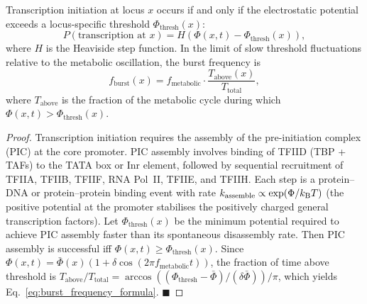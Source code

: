 \begin{theorem}
\label{thm:charge_threshold}
Transcription initiation at locus $x$ occurs if and only if the electrostatic
potential exceeds a locus-specific threshold $\Phi_{\mathrm{thresh}}(x)$:
\begin{equation}
  P(\text{transcription at } x) = H(\Phi(x,t) - \Phi_{\mathrm{thresh}}(x)),
  \label{eq:transcription_threshold}
\end{equation}
where $H$ is the Heaviside step function. In the limit of slow threshold
fluctuations relative to the metabolic oscillation, the burst frequency is
\begin{equation}
  f_{\mathrm{burst}}(x) = f_{\mathrm{metabolic}} \cdot
  \frac{T_{\mathrm{above}}(x)}{T_{\mathrm{total}}},
  \label{eq:burst_frequency_formula}
\end{equation}
where $T_{\mathrm{above}}$ is the fraction of the metabolic cycle during which
$\Phi(x,t) > \Phi_{\mathrm{thresh}}(x)$.
\end{theorem}

\begin{proof}
Transcription initiation requires the assembly of the pre-initiation complex
(PIC) at the core promoter. PIC assembly involves binding of TFIID (TBP +
TAFs) to the TATA box or Inr element, followed by sequential recruitment of
TFIIA, TFIIB, TFIIF, RNA Pol~II, TFIIE, and TFIIH. Each step is a
protein--DNA or protein--protein binding event with rate
$k_{\mathrm{assemble}} \propto \exp(\Phi/k_{\mathrm{B}} T)$ (the positive potential at
the promoter stabilises the positively charged general transcription factors).
Let $\Phi_{\mathrm{thresh}}(x)$ be the minimum potential required to achieve
PIC assembly faster than its spontaneous disassembly rate. Then PIC assembly
is successful iff $\Phi(x,t) \geq \Phi_{\mathrm{thresh}}(x)$.
Since $\Phi(x,t) = \bar\Phi(x)(1 + \delta\cos(2\pi f_{\mathrm{metabolic}}t))$,
the fraction of time above threshold is
$T_{\mathrm{above}}/T_{\mathrm{total}} =
\arccos((\Phi_{\mathrm{thresh}} - \bar\Phi)/(\delta\bar\Phi))/\pi$,
which yields Eq.~\eqref{eq:burst_frequency_formula}. $\blacksquare$
\end{proof}


